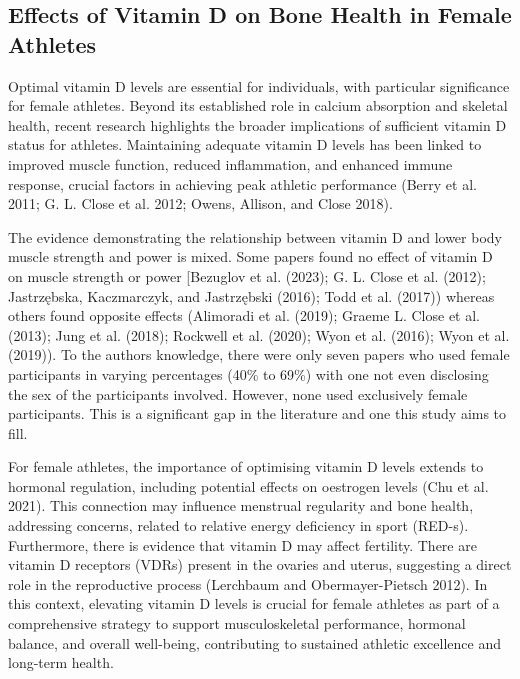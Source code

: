 \documentclass[
]{article}
\begin{document}
\subsection{Effects of Vitamin D on Bone Health in Female Athletes}\label{effects-of-vitamin-d-on-bone-health-in-female-athletes}

Optimal vitamin D levels are essential for individuals, with particular significance for female athletes. Beyond its established role in calcium absorption and skeletal health, recent research highlights the broader implications of sufficient vitamin D status for athletes. Maintaining adequate vitamin D levels has been linked to improved muscle function, reduced inflammation, and enhanced immune response, crucial factors in achieving peak athletic performance (Berry et al. 2011; G. L. Close et al. 2012; Owens, Allison, and Close 2018).

The evidence demonstrating the relationship between vitamin D and lower body muscle strength and power is mixed. Some papers found no effect of vitamin D on muscle strength or power {[}Bezuglov et al. (2023); G. L. Close et al. (2012); Jastrzębska, Kaczmarczyk, and Jastrzębski (2016); Todd et al. (2017)) whereas others found opposite effects (Alimoradi et al. (2019); Graeme L. Close et al. (2013); Jung et al. (2018); Rockwell et al. (2020); Wyon et al. (2016); Wyon et al. (2019)). To the authors knowledge, there were only seven papers who used female participants in varying percentages (40\% to 69\%) with one not even disclosing the sex of the participants involved. However, none used exclusively female participants. This is a significant gap in the literature and one this study aims to fill.

For female athletes, the importance of optimising vitamin D levels extends to hormonal regulation, including potential effects on oestrogen levels (Chu et al. 2021). This connection may influence menstrual regularity and bone health, addressing concerns, related to relative energy deficiency in sport (RED-s). Furthermore, there is evidence that vitamin D may affect fertility. There are vitamin D receptors (VDRs) present in the ovaries and uterus, suggesting a direct role in the reproductive process (Lerchbaum and Obermayer-Pietsch 2012). In this context, elevating vitamin D levels is crucial for female athletes as part of a comprehensive strategy to support musculoskeletal performance, hormonal balance, and overall well-being, contributing to sustained athletic excellence and long-term health.
\end{document}
